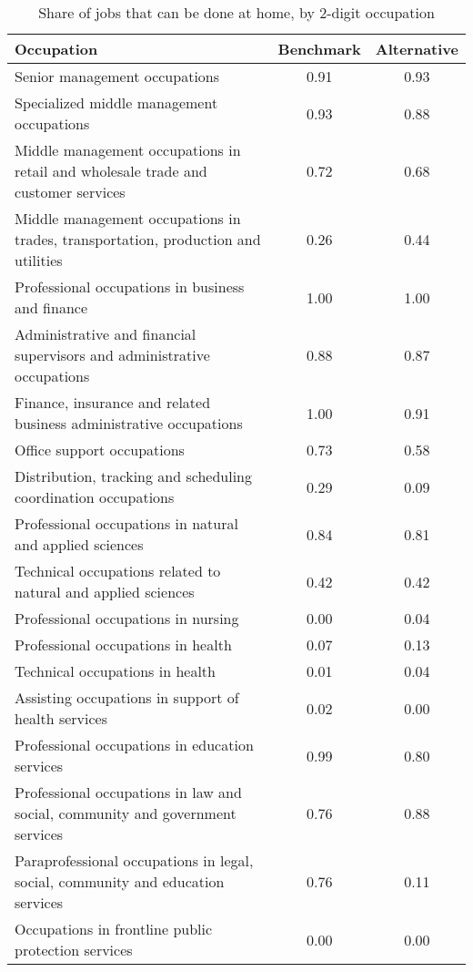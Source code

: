 \begin{table}[ht]
\centering
\caption{Share of jobs that can be done at home, by 2-digit occupation} 
\label{tab:industry_lfs}
\begingroup\small
\begin{tabular}{lcc}
  \hline
Occupation & Benchmark & Alternative \\ 
  \hline
Senior management occupations & 0.91 & 0.93 \\ 
  Specialized middle management occupations & 0.93 & 0.88 \\ 
  Middle management occupations in retail and wholesale trade and customer services & 0.72 & 0.68 \\ 
  Middle management occupations in trades, transportation, production and utilities & 0.26 & 0.44 \\ 
  Professional occupations in business and finance & 1.00 & 1.00 \\ 
  Administrative and financial supervisors and administrative occupations & 0.88 & 0.87 \\ 
  Finance, insurance and related business administrative occupations & 1.00 & 0.91 \\ 
  Office support occupations & 0.73 & 0.58 \\ 
  Distribution, tracking and scheduling coordination occupations & 0.29 & 0.09 \\ 
  Professional occupations in natural and applied sciences & 0.84 & 0.81 \\ 
  Technical occupations related to natural and applied sciences & 0.42 & 0.42 \\ 
  Professional occupations in nursing & 0.00 & 0.04 \\ 
  Professional occupations in health & 0.07 & 0.13 \\ 
  Technical occupations in health & 0.01 & 0.04 \\ 
  Assisting occupations in support of health services & 0.02 & 0.00 \\ 
  Professional occupations in education services & 0.99 & 0.80 \\ 
  Professional occupations in law and social, community and government services & 0.76 & 0.88 \\ 
  Paraprofessional occupations in legal, social, community and education services & 0.76 & 0.11 \\ 
  Occupations in frontline public protection services & 0.00 & 0.00 \\ 

\end{tabular}
\end{table}
